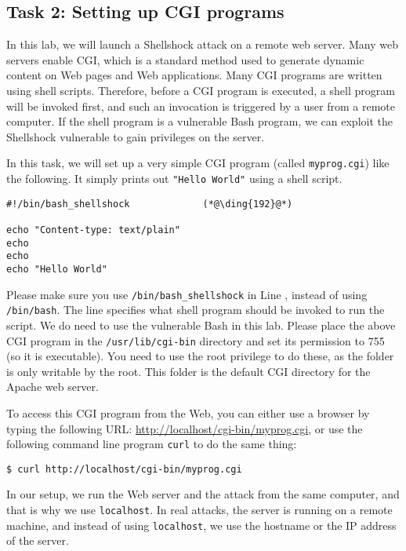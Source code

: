 \subsection{Task 2: Setting up CGI programs}

In this lab, we will launch a Shellshock attack on a remote web server. 
Many web servers enable CGI, which is a standard method used to generate 
dynamic content on Web pages and Web applications. Many CGI programs are 
written using shell scripts. Therefore, before a CGI program is executed,
a shell program will be invoked first, and such an invocation is
triggered by a user from a remote computer. If the shell program is 
a vulnerable Bash program, we can exploit the Shellshock vulnerable to 
gain privileges on the server. 


In this task, we will set up a very simple CGI 
program (called \texttt{myprog.cgi}) like the
following. It simply prints out {\tt "Hello World"} using a shell script.


\begin{lstlisting}
#!/bin/bash_shellshock             (*@\ding{192}@*)

echo "Content-type: text/plain"
echo
echo
echo "Hello World"
\end{lstlisting}

Please make sure you use \texttt{/bin/bash\_shellshock} in 
Line , instead of using \texttt{/bin/bash}. The line specifies
what shell program should be invoked to run the script. We do need to use
the vulnerable Bash in this lab. Please place the above CGI program in the
\texttt{/usr/lib/cgi-bin} directory and set its permission to 755 (so it is
executable). You need to use the root privilege to do these, as the folder
is only writable by the root.  This folder is the default CGI directory for
the Apache web server. 


To access this CGI program from the Web, you can either use a browser by
typing the following URL: \url{http://localhost/cgi-bin/myprog.cgi}, or 
use the following command line program {\tt curl} to do the same thing:

\begin{lstlisting}
$ curl http://localhost/cgi-bin/myprog.cgi
\end{lstlisting}

In our setup, we run the Web server and the attack from the same computer,
and that is why we use \texttt{localhost}. In real attacks, the server is running on a remote
machine, and instead of using \texttt{localhost}, we use the hostname or the
IP address of the server. 



